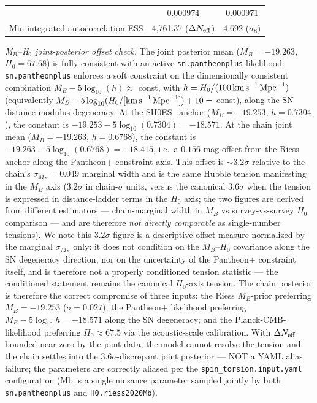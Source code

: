 \documentclass[aps,prd,twocolumn,superscriptaddress,showpacs,preprintnumbers,nofootinbib,longbibliography,floatfix]{revtex4-2}
\newcommand{\Neff}{N_{\rm eff}}
\begin{document}
\begin{table}[t]
\begin{ruledtabular}
\begin{tabular}{lcc}
{} & 0.000974 & 0.000971 \\
Min integrated-autocorrelation ESS & 4{,}761.37 ($\Delta N_{\rm eff}$) & 4{,}692 ($\sigma_8$) \\
\end{tabular}
\end{ruledtabular}
\end{table}


\textit{M$_B$--H$_0$ joint-posterior offset check.} The joint posterior mean
($M_B = -19.263$, $H_0 = 67.68$) is fully consistent with an active
\texttt{sn.pantheonplus} likelihood: \texttt{sn.pantheonplus} enforces a
soft constraint on the dimensionally consistent combination
$M_B - 5\log_{10}(h) \approx$ const, with
$h = H_0/(100\,\text{km\,s}^{-1}\,\text{Mpc}^{-1})$ (equivalently
$M_B - 5\log_{10}(H_0/[\text{km\,s}^{-1}\,\text{Mpc}^{-1}]) + 10 =$ const),
along the SN distance-modulus degeneracy. At the SH0ES~\cite{Riess2022} anchor
($M_B = -19.253$, $h = 0.7304$), the constant is
$-19.253 - 5\log_{10}(0.7304) = -18.571$. At the chain joint mean
($M_B = -19.263$, $h = 0.6768$), the constant is
$-19.263 - 5\log_{10}(0.6768) = -18.415$, i.e.\ a $0.156$ mag offset from
the Riess anchor along the Pantheon+ constraint axis. This offset is
$\sim 3.2\sigma$ relative to the chain's $\sigma_{M_B} = 0.049$ marginal
width and is the same Hubble tension manifesting in the $M_B$ axis
($3.2\sigma$ in chain-$\sigma$ units, versus the canonical $3.6\sigma$
when the tension is expressed in distance-ladder
terms in the $H_0$ axis; the two figures are derived from different
estimators --- chain-marginal width in $M_B$ vs survey-vs-survey
$H_0$ comparison --- and are therefore \emph{not directly comparable}
as single-number tensions). We note this $3.2\sigma$ figure is a
descriptive offset measure normalized by the marginal $\sigma_{M_B}$
only: it does not condition on the $M_B$--$H_0$ covariance along the SN
degeneracy direction, nor on the uncertainty of the Pantheon+ constraint
itself, and is therefore not a properly conditioned tension statistic ---
the conditioned statement remains the canonical $H_0$-axis tension. The chain posterior is therefore the correct compromise of three
inputs: the Riess $M_B$-prior preferring $M_B = -19.253$ ($\sigma=0.027$);
the Pantheon+ likelihood preferring $M_B - 5\log_{10} h = -18.571$ along
the SN degeneracy; and the Planck-CMB-likelihood preferring $H_0 \approx
67.5$ via the acoustic-scale calibration. With $\Delta\Neff$ bounded
near zero by the joint data, the model cannot resolve the tension and
the chain settles into the 3.6$\sigma$-discrepant joint posterior ---
NOT a YAML alias failure; the parameters are correctly aliased per the
\texttt{spin\_torsion.input.yaml} configuration (Mb is a single
nuisance parameter sampled jointly by both \texttt{sn.pantheonplus} and
\texttt{H0.riess2020Mb}).
\end{document}
